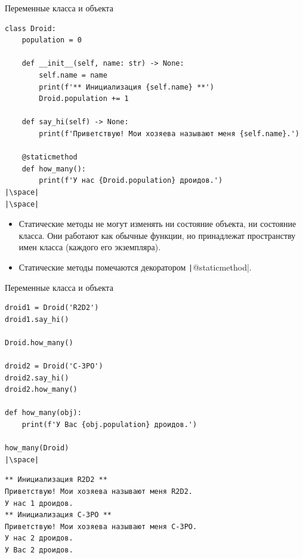 \documentclass[aspectratio=169, mathserif]{beamer}	%
\begin{document}
\begin{frame}[fragile]{Переменные класса и объекта}
\scriptsize
\begin{verbatim}
class Droid:
    population = 0

    def __init__(self, name: str) -> None:
        self.name = name
        print(f'** Инициализация {self.name} **')
        Droid.population += 1

    def say_hi(self) -> None:
        print(f'Приветствую! Мои хозяева называют меня {self.name}.')

    @staticmethod
    def how_many():
        print(f'У нас {Droid.population} дроидов.')
|\space|
|\space|
\end{verbatim}
\vfill
\begin{itemize}
\item Статические методы не могут изменять ни состояние объекта, ни состояние класса. Они работают как обычные функции, но принадлежат пространству имен класса (каждого его экземпляра).
\item Статические методы помечаются декоратором \texttt|@staticmethod|.
\end{itemize}
\vfill
\end{frame}


\begin{frame}[fragile]{Переменные класса и объекта}
\scriptsize
\begin{verbatim}
droid1 = Droid('R2D2')
droid1.say_hi()

Droid.how_many()

droid2 = Droid('C-3PO')
droid2.say_hi()
droid2.how_many()

def how_many(obj):
    print(f'У Вас {obj.population} дроидов.')

how_many(Droid)
|\space|
\end{verbatim}
\begin{verbatim}
** Инициализация R2D2 **
Приветствую! Мои хозяева называют меня R2D2.
У нас 1 дроидов.
** Инициализация C-3PO **
Приветствую! Мои хозяева называют меня C-3PO.
У нас 2 дроидов.
У Вас 2 дроидов.
\end{verbatim}
\vfill
\end{frame}
\end{document}
